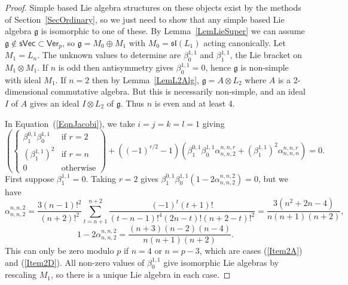 \documentclass[11pt,a4paper,reqno]{amsart}
\theoremstyle{definition}
\numberwithin{equation}{section}
\newcommand{\Ver}{\mathsf{Ver}}
\newcommand{\fg}{\mathfrak{g}}
\newcommand{\fsl}{\mathfrak{sl}}
\newcommand{\sVec}{\mathsf{sVec}}
\begin{document}
\begin{proof}
Simple based Lie algebra structures on these objects exist by the methods of Section~\ref{SecOrdinary}, so we just need to show that any simple based Lie algebra $\fg$ is isomorphic to one of these. By Lemma~\ref{LemLieSuper} we can assume $\fg\not\in\sVec\subset\Ver_p$, so $\fg=M_0\oplus M_1$ with $M_0=\fsl(L_1)$ acting canonically. Let $M_1=L_n$. The unknown values to determine are $\beta^{1,1}_0$ and $\beta^{1,1}_1$, the Lie bracket on $M_1\otimes M_1$. If $n$ is odd then antisymmetry gives $\beta^{1,1}_0=0$, hence $\fg$ is non-simple with ideal $M_1$. If $n=2$ then by Lemma~\ref{LemL2Alg}, $\fg=A\otimes L_2$ where $A$ is a 2-dimensional commutative algebra. But this is necessarily non-simple, and an ideal $I$ of $A$ gives an ideal $I\otimes L_2$ of $\fg$. Thus $n$ is even and at least 4.

In Equation~(\ref{EqnJacobi}), we take $i=j=k=l=1$ giving
\begin{equation}\label{EqnRank2}
\left(\begin{cases}\beta^{0,1}_1\beta^{1,1}_0&\text{if }r=2\\(\beta^{1,1}_1)^2&\text{if }r=n\\0&\text{otherwise}\end{cases}\right)+\left((-1)^{r/2}-1\right)\left(\beta^{0,1}_1\beta^{1,1}_0\alpha^{n,n,r}_{n,n,2}+(\beta^{1,1}_1)^2\alpha^{n,n,r}_{n,n,n}\right)=0.
\end{equation}
First suppose $\beta^{1,1}_1=0$. Taking $r=2$ gives $\beta^{0,1}_1\beta^{1,1}_0(1-2\alpha^{n,n,2}_{n,n,2})=0$, but we have
\[\alpha^{n,n,2}_{n,n,2}=\frac{3(n-1)!^2}{(n+2)!^2}\sum_{t=n+1}^{n+2}\frac{(-1)^t(t+1)!}{(t-n-1)!^4(2n-t)!(n+2-t)!^2}=\frac{3(n^2+2n-4)}{n(n+1)(n+2)},\]
\[1-2\alpha^{n,n,2}_{n,n,2}=\frac{(n+3)(n-2)(n-4)}{n(n+1)(n+2)}.\]
This can only be zero modulo $p$ if $n=4$ or $n=p-3$, which are cases (\ref{Item2A}) and (\ref{Item2D}). All non-zero values of $\beta^{1,1}_0$ give isomorphic Lie algebras by rescaling $M_1$, so there is a unique Lie algebra in each case.


\end{proof}
\end{document}
